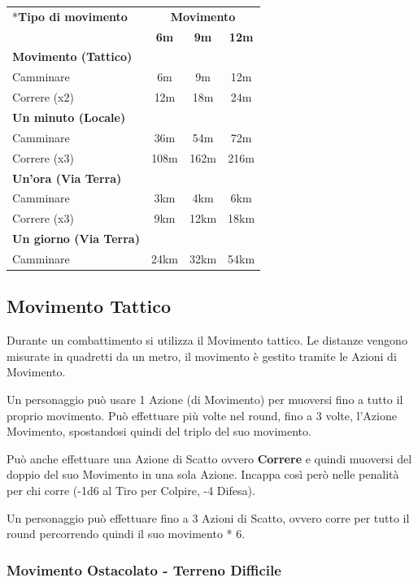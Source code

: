 \begin{multicols}{2}
\noindent\begin{tabularx}{\linewidth}{lccc}
	\toprule
\rowcolor{gray!20}\multirow{2}*{\textbf{Tipo di movimento}} &
\multicolumn{3}{c}{\textbf{Movimento}}\\
\cmidrule(lr){2-4} & \textbf{6m}& \textbf{9m} & \textbf{12m}\\
\midrule
\rowcolor{gray!20}\textbf{Movimento (Tattico)}&&&\\
Camminare& 6m & 9m & 12m\\
\rowcolor{gray!20}Correre (x2) & 12m& 18m& 24m\\
\textbf{Un minuto (Locale)}&&& \\
\rowcolor{gray!20}Camminare & 36m& 54m& 72m \\
Correre (x3) & 108m & 162m & 216m \\
\rowcolor{gray!20}\textbf{Un'ora (Via Terra)}&&& \\
Camminare& 3km& 4km& 6km\\
\rowcolor{gray!20}Correre (x3) & 9km& 12km & 18km \\
\textbf{Un giorno (Via Terra)}&&&\\
\rowcolor{gray!20}Camminare& 24km & 32km & 54km
\end{tabularx}

\subsection{Movimento Tattico}\label{movimentotattico}

Durante un combattimento si utilizza il Movimento tattico.
Le distanze vengono misurate in quadretti da un metro, il movimento è gestito tramite le Azioni di Movimento.

Un personaggio può usare 1 Azione (di Movimento) per muoversi fino a tutto il proprio movimento. Può effettuare più volte nel round, fino a 3 volte, l'Azione Movimento, spostandosi quindi del triplo del suo movimento.

Può anche effettuare una Azione di Scatto ovvero \textbf{Correre} e quindi muoversi del doppio del suo Movimento in una sola Azione. Incappa così però nelle penalità per chi corre (-1d6 al Tiro per Colpire, -4 Difesa).

Un personaggio può effettuare fino a 3 Azioni di Scatto, ovvero corre per tutto il round percorrendo quindi il suo movimento * 6.

\subsubsection{Movimento Ostacolato - Terreno Difficile}\label{terrenodifficile}


\end{multicols}
